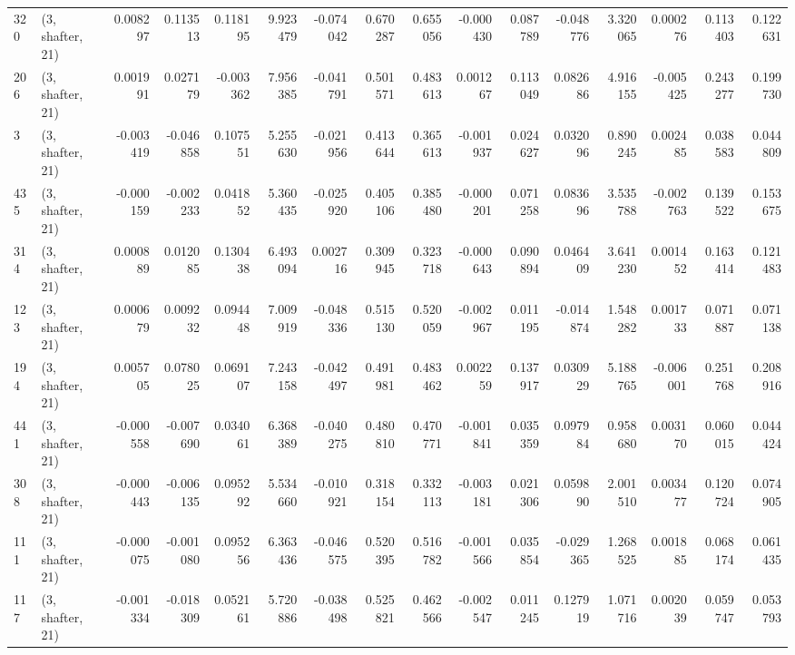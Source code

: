 \begin{tabular}{llrrrrrrrrrrrrrr}
320 &  (3, shafter, 21) &   0.008297 &  0.113513 &  0.118195 &   9.923479 & -0.074042 &   0.670287 &  0.655056 & -0.000430 &  0.087789 & -0.048776 &     3.320065 &   0.000276 &   0.113403 &   0.122631 \\
206 &  (3, shafter, 21) &   0.001991 &  0.027179 & -0.003362 &   7.956385 & -0.041791 &   0.501571 &  0.483613 &  0.001267 &  0.113049 &  0.082686 &     4.916155 &  -0.005425 &   0.243277 &   0.199730 \\
3   &  (3, shafter, 21) &  -0.003419 & -0.046858 &  0.107551 &   5.255630 & -0.021956 &   0.413644 &  0.365613 & -0.001937 &  0.024627 &  0.032096 &     0.890245 &   0.002485 &   0.038583 &   0.044809 \\
435 &  (3, shafter, 21) &  -0.000159 & -0.002233 &  0.041852 &   5.360435 & -0.025920 &   0.405106 &  0.385480 & -0.000201 &  0.071258 &  0.083696 &     3.535788 &  -0.002763 &   0.139522 &   0.153675 \\
314 &  (3, shafter, 21) &   0.000889 &  0.012085 &  0.130438 &   6.493094 &  0.002716 &   0.309945 &  0.323718 & -0.000643 &  0.090894 &  0.046409 &     3.641230 &   0.001452 &   0.163414 &   0.121483 \\
123 &  (3, shafter, 21) &   0.000679 &  0.009232 &  0.094448 &   7.009919 & -0.048336 &   0.515130 &  0.520059 & -0.002967 &  0.011195 & -0.014874 &     1.548282 &   0.001733 &   0.071887 &   0.071138 \\
194 &  (3, shafter, 21) &   0.005705 &  0.078025 &  0.069107 &   7.243158 & -0.042497 &   0.491981 &  0.483462 &  0.002259 &  0.137917 &  0.030929 &     5.188765 &  -0.006001 &   0.251768 &   0.208916 \\
441 &  (3, shafter, 21) &  -0.000558 & -0.007690 &  0.034061 &   6.368389 & -0.040275 &   0.480810 &  0.470771 & -0.001841 &  0.035359 &  0.097984 &     0.958680 &   0.003170 &   0.060015 &   0.044424 \\
308 &  (3, shafter, 21) &  -0.000443 & -0.006135 &  0.095292 &   5.534660 & -0.010921 &   0.318154 &  0.332113 & -0.003181 &  0.021306 &  0.059890 &     2.001510 &   0.003477 &   0.120724 &   0.074905 \\
111 &  (3, shafter, 21) &  -0.000075 & -0.001080 &  0.095256 &   6.363436 & -0.046575 &   0.520395 &  0.516782 & -0.001566 &  0.035854 & -0.029365 &     1.268525 &   0.001885 &   0.068174 &   0.061435 \\
117 &  (3, shafter, 21) &  -0.001334 & -0.018309 &  0.052161 &   5.720886 & -0.038498 &   0.525821 &  0.462566 & -0.002547 &  0.011245 &  0.127919 &     1.071716 &   0.002039 &   0.059747 &   0.053793 \\

\end{tabular}
